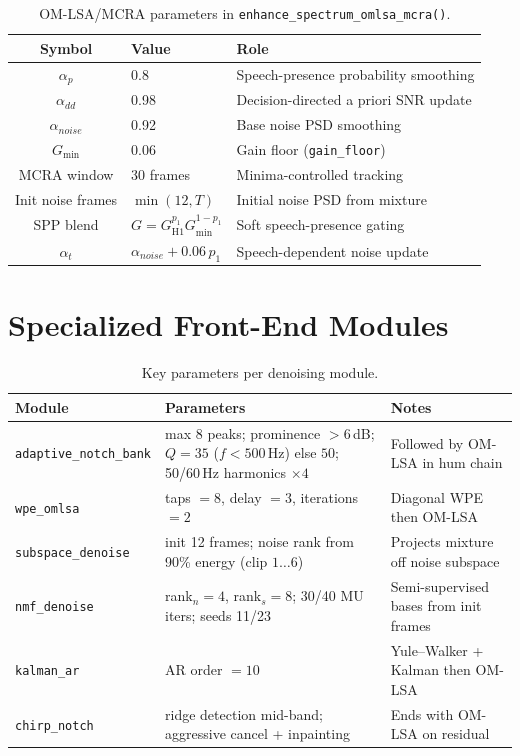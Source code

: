 \begin{table}[H]
  \centering
  \caption{OM-LSA/MCRA parameters in \texttt{enhance\_spectrum\_omlsa\_mcra()}.}
  \label{tab:hp_omlsa}
  \begin{tabular}{cll}
    \toprule
    \textbf{Symbol} & \textbf{Value} & \textbf{Role} \\
    \midrule
    $\alpha_p$        & 0.8   & Speech-presence probability smoothing \\
    $\alpha_{dd}$     & 0.98  & Decision-directed a priori SNR update \\
    $\alpha_{noise}$  & 0.92  & Base noise PSD smoothing \\
    $G_{\min}$        & 0.06  & Gain floor (\texttt{gain\_floor}) \\
    MCRA window       & 30 frames & Minima-controlled tracking~\cite{cohen2003mcra,loizou2013} \\
    Init noise frames & $\min(12,T)$ & Initial noise PSD from mixture \\
    SPP blend         & $G = G_{\mathrm{H1}}^{p_1} G_{\min}^{1-p_1}$ & Soft speech-presence gating \\
    $\alpha_t$        & $\alpha_{noise}+0.06\,p_1$ & Speech-dependent noise update \\
    \bottomrule
  \end{tabular}
\end{table}

\section{Specialized Front-End Modules}
\label{app:modules_hp}

\begin{table}[H]
  \centering
  \caption{Key parameters per denoising module.}
  \label{tab:hp_modules}
  \footnotesize
  \begin{tabularx}{\textwidth}{l l X}
    \toprule
    \textbf{Module} & \textbf{Parameters} & \textbf{Notes} \\
    \midrule
    \texttt{adaptive\_notch\_bank} &
    max 8 peaks; prominence $>6$\,dB; $Q{=}35$ ($f{<}500$\,Hz) else $50$; 50/60\,Hz harmonics $\times 4$ &
    Followed by OM-LSA in hum chain \\
    \texttt{wpe\_omlsa} &
    taps $=8$, delay $=3$, iterations $=2$ &
    Diagonal WPE then OM-LSA \\
    \texttt{subspace\_denoise} &
    init 12 frames; noise rank from 90\% energy (clip $1\ldots 6$) &
    Projects mixture off noise subspace \\
    \texttt{nmf\_denoise} &
    rank$_n{=}4$, rank$_s{=}8$; 30/40 MU iters; seeds 11/23 &
    Semi-supervised bases from init frames \\
    \texttt{kalman\_ar} &
    AR order $=10$ &
    Yule--Walker + Kalman then OM-LSA \\
    \texttt{chirp\_notch} &
    ridge detection mid-band; aggressive cancel + inpainting &
    Ends with OM-LSA on residual \\
    \bottomrule
  \end{tabularx}
\end{table}


